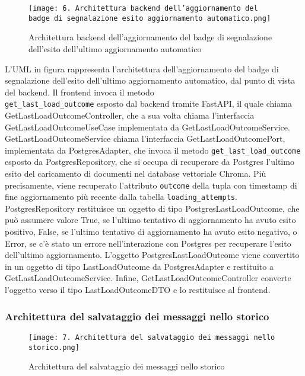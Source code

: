 \begin{figure}[h]
    \centering
    \texttt{[image: 6. Architettura backend dell'aggiornamento del badge di segnalazione esito aggiornamento automatico.png]}
    \caption{Architettura backend dell’aggiornamento del badge di segnalazione dell’esito dell’ultimo aggiornamento automatico}
\end{figure}

L'UML in figura rappresenta l'architettura dell'aggiornamento del badge di segnalazione dell'esito dell'ultimo aggiornamento automatico, dal punto di vista del backend. Il frontend invoca il metodo\\ \texttt{get\_last\_load\_outcome} esposto dal backend tramite FastAPI, il quale chiama GetLastLoadOutcomeController, che a sua volta chiama l'interfaccia GetLastLoadOutcomeUseCase implementata da GetLastLoadOutcomeService. GetLastLoadOutcomeService chiama l'interfaccia GetLastLoadOutcomePort, implementata da PostgresAdapter, che invoca il metodo \texttt{get\_last\_load\_outcome} esposto da PostgresRepository, che si occupa di recuperare da Postgres l'ultimo esito del caricamento di documenti nel database vettoriale Chroma. Più precisamente, viene recuperato l'attributo \texttt{outcome} della tupla con timestamp di fine aggiornamento più recente dalla tabella \texttt{loading\_attempts}. PostgresRepository restituisce un oggetto di tipo PostgresLastLoadOutcome, che può assumere valore True, se l'ultimo tentativo di aggiornamento ha avuto esito positivo, False, se l'ultimo tentativo di aggiornamento ha avuto esito negativo, o Error, se c'è stato un errore nell'interazione con Postgres per recuperare l'esito dell'ultimo aggiornamento. L'oggetto PostgresLastLoadOutcome viene convertito in un oggetto di tipo LastLoadOutcome da PostgresAdapter e restituito a GetLastLoadOutcomeService. Infine, GetLastLoadOutcomeController converte l'oggetto verso il tipo LastLoadOutcomeDTO e lo restituisce al frontend.

\newpage


\subsubsection{Architettura del salvataggio dei messaggi nello storico}
\label{sec:architettura_salvataggio_messaggi_storico}

\begin{figure}[h]
    \centering
    \texttt{[image: 7. Architettura del salvataggio dei messaggi nello storico.png]}
    \caption{Architettura del salvataggio dei messaggi nello storico}
\end{figure}

